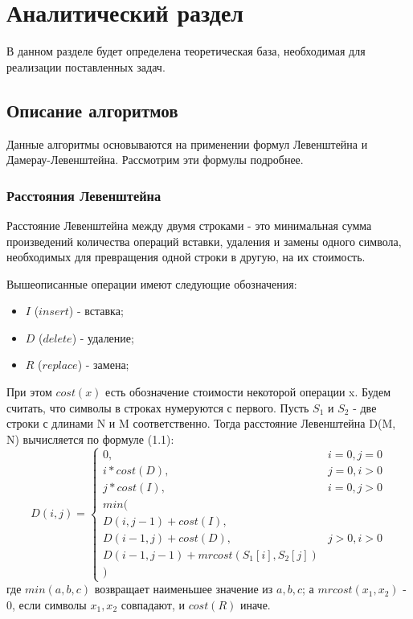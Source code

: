 \chapter{Аналитический раздел}
\label{cha:analysis}

В данном разделе будет определена теоретическая база, необходимая для реализации поставленных задач.

\section{Описание алгоритмов}

Данные алгоритмы основываются на применении формул Левенштейна и Дамерау-Левенштейна. Рассмотрим эти формулы подробнее.

\subsection{Расстояния Левенштейна}

Расстояние Левенштейна между двумя строками - это минимальная сумма произведений количества операций вставки, удаления и замены одного символа, необходимых для превращения одной строки в другую, на их стоимость.

Вышеописанные операции имеют следующие обозначения:
\begin{itemize}
    \item $I$ ($insert$) - вставка;
    \item $D$ ($delete$) - удаление;
    \item $R$ ($replace$) - замена;
\end{itemize}

При этом $cost(x)$ есть обозначение стоимости некоторой операции x. Будем считать, что символы в строках нумеруются с первого. Пусть $S_{1}$ и $S_{2}$ - две строки с длинами N и M соответственно. Тогда расстояние Левенштейна D(M, N) вычисляется по формуле (1.1):
\begin{equation}
D(i,j) = \left\{ \begin{array}{ll}
 0, & \textrm{$i = 0, j = 0$}\\
 i * cost(D), & \textrm{$j = 0, i > 0$}\\
 j * cost(I), & \textrm{$i = 0, j > 0$}\\
min(\\
D(i,j-1) + cost(I),\\
D(i-1, j) + cost(D), &\textrm{$j > 0, i > 0$}\\
D(i-1, j-1) + mrcost(S_1[i], S_2[j])\\
)
  \end{array} \right.
\end{equation}
где $min(a, b, c)$ возвращает наименьшее значение из $a, b, c$; а $mrcost(x_1, x_2)$ - 0, если символы $x_1, x_2$ совпадают, и $cost(R)$ иначе.


